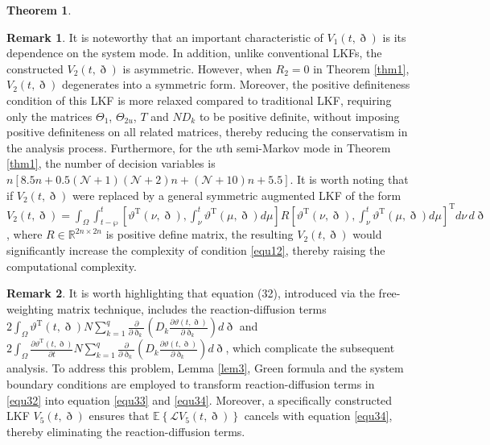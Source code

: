 \documentclass[preprint,review,fleqn,sort&compress,3p]{elsarticle}
\theoremstyle{definition}%
\newtheorem{thm}{Theorem}[section]
\newtheorem{rem}{Remark}[section]
\begin{document}
\begin{thm}
	\begin{rem}\label{rem5}
		It is noteworthy that an important characteristic of $V_1(t, \eth)$ is its dependence on the system mode. In addition, unlike conventional LKFs, the constructed $V_2(t, \eth)$ is asymmetric. However, when $R_2 = 0$ in Theorem \ref{thm1}, $V_2(t, \eth)$ degenerates into a symmetric form. Moreover, the positive definiteness condition of this LKF is more relaxed compared to traditional LKF, requiring only the matrices $\Theta_{1}$, $\Theta_{2u}$, $T$ and $N D_k$ to be positive definite, without imposing positive definiteness on all related matrices, thereby reducing the conservatism in the analysis process. {\color{red}Furthermore, for the $u$th semi-Markov mode in Theorem \ref{thm1}, the number of decision variables is $n[8.5n+0.5(\mathcal{N}+1)( \mathcal{N}+2)n+(\mathcal{N}+10)n+5.5]$. It is worth noting that if $V_2(t, \eth)$ were replaced by a general symmetric augmented LKF of the form $V_2(t, \eth) = \int_\Omega \int_{t-\wp}^t \left[\vartheta^\text{T}(\nu, \eth), \int_\nu^t \vartheta^\text{T}(\mu, \eth) d\mu \right] R \left[ \vartheta^\text{T}(\nu, \eth), \int_\nu^t \vartheta^\text{T}(\mu, \eth) d\mu \right]^\text{T} d\nu \, d\eth$, where $R \in \mathbb{R}^{2n \times 2n}$ is positive define matrix, the resulting $V_2(t, \eth)$ would significantly increase the complexity of condition \eqref{equ12}, thereby raising the computational complexity.}
	\end{rem}
	\begin{rem}\label{rem6}
		 It is worth highlighting that equation (32), introduced via the free-weighting matrix technique, includes the reaction-diffusion terms $2 \int_\Omega \vartheta^\text{T}(t, \eth) N \sum_{k=1}^q \frac{\partial}{\partial \eth_k} \left( D_k \frac{\partial \vartheta(t, \eth)}{\partial \eth_k} \right) d\eth$ and $2\int_\Omega \frac{\partial \vartheta^\text{T}(t, \eth)}{\partial t} N \sum_{k=1}^q \frac{\partial}{\partial \eth_k} \left( D_k \frac{\partial \vartheta(t, \eth)}{\partial \eth_k} \right) d\eth$, which complicate the subsequent analysis. To address this problem, Lemma \ref{lem3}, Green formula and the system boundary conditions are employed to transform reaction-diffusion terms in \eqref{equ32} into equation \eqref{equ33} and \eqref{equ34}. Moreover, a specifically constructed LKF $V_5(t,\eth)$ ensures that $\mathbb{E}\left\{\mathcal{L} V_5(t, \eth)\right\}$ cancels with equation \eqref{equ34}, thereby eliminating the reaction-diffusion terms.
	\end{rem}
\end{thm}
\end{document}
